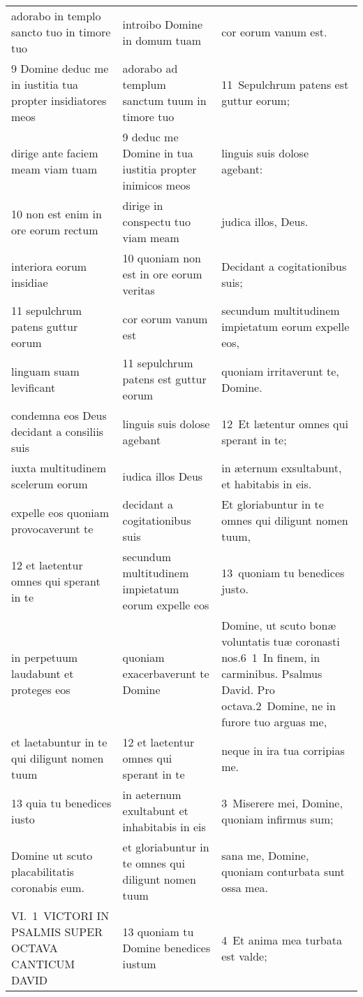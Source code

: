 \documentclass{article}
\begin{document}
\begin{longtable}{@{}p{}p{}p{}@{}}
adorabo in templo sancto tuo in timore tuo	&	introibo Domine in domum tuam	&	cor eorum vanum est.	\\
9 Domine deduc me in iustitia tua propter insidiatores meos	&	adorabo ad templum sanctum tuum in timore tuo	&	11 Sepulchrum patens est guttur eorum;	\\
dirige ante faciem meam viam tuam	&	9 deduc me Domine in tua iustitia propter inimicos meos	&	linguis suis dolose agebant:	\\
10 non est enim in ore eorum rectum	&	dirige in conspectu tuo viam meam	&	judica illos, Deus.	\\
interiora eorum insidiae	&	10 quoniam non est in ore eorum veritas	&	Decidant a cogitationibus suis;	\\
11 sepulchrum patens guttur eorum	&	cor eorum vanum est	&	secundum multitudinem impietatum eorum expelle eos,	\\
linguam suam levificant	&	11 sepulchrum patens est guttur eorum	&	quoniam irritaverunt te, Domine.	\\
condemna eos Deus decidant a consiliis suis	&	linguis suis dolose agebant	&	12 Et lætentur omnes qui sperant in te;	\\
iuxta multitudinem scelerum eorum	&	iudica illos Deus	&	in æternum exsultabunt, et habitabis in eis.	\\
expelle eos quoniam provocaverunt te	&	decidant a cogitationibus suis	&	Et gloriabuntur in te omnes qui diligunt nomen tuum,	\\
12 et laetentur omnes qui sperant in te	&	secundum multitudinem impietatum eorum expelle eos	&	13 quoniam tu benedices justo.	\\
in perpetuum laudabunt et proteges eos	&	quoniam exacerbaverunt te Domine	&	Domine, ut scuto bonæ voluntatis tuæ coronasti nos.6 1 In finem, in carminibus. Psalmus David. Pro octava.2 Domine, ne in furore tuo arguas me,	\\
et laetabuntur in te qui diligunt nomen tuum	&	12 et laetentur omnes qui sperant in te	&	neque in ira tua corripias me.	\\
13 quia tu benedices iusto	&	in aeternum exultabunt et inhabitabis in eis	&	3 Miserere mei, Domine, quoniam infirmus sum;	\\
Domine ut scuto placabilitatis coronabis eum.	&	et gloriabuntur in te omnes qui diligunt nomen tuum	&	sana me, Domine, quoniam conturbata sunt ossa mea.	\\
VI. 1 VICTORI IN PSALMIS SUPER OCTAVA CANTICUM DAVID	&	13 quoniam tu Domine benedices iustum	&	4 Et anima mea turbata est valde;	\\

\end{longtable}
\end{document}
